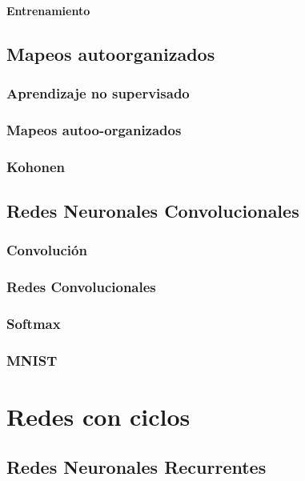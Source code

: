 \documentclass[12pt,openany]{book}
\begin{document}
\subsection{Entrenamiento}

\chapter{Mapeos autoorganizados}
\section{Aprendizaje no supervisado}
\section{Mapeos autoo-organizados}
\section{Kohonen}

\chapter{Redes Neuronales Convolucionales}
\section{Convolución}
\section{Redes Convolucionales}
\section{Softmax}
\section{MNIST}

\part{Redes con ciclos}
\chapter{Redes Neuronales Recurrentes}
\end{document}
